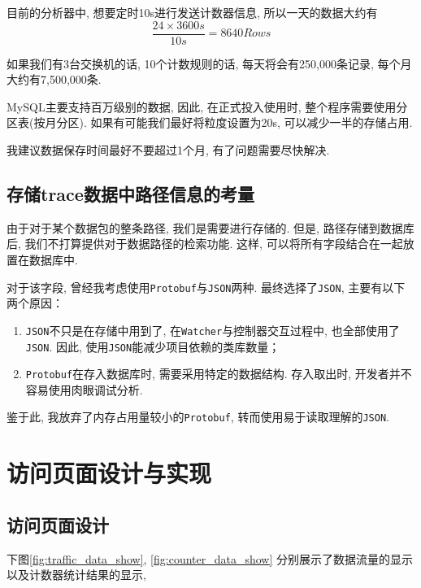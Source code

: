 目前的分析器中, 想要定时10s进行发送计数器信息, 所以一天的数据大约有
$$\frac{24 \times 3600 s}{10s} = 8640 Rows $$

如果我们有3台交换机的话, 10个计数规则的话, 每天将会有250,000条记录,
每个月大约有7,500,000条.

MySQL主要支持百万级别的数据, 因此, 在正式投入使用时,
整个程序需要使用分区表(按月分区).
如果有可能我们最好将粒度设置为20s, 可以减少一半的存储占用.

我建议数据保存时间最好不要超过1个月, 有了问题需要尽快解决.


\subsection{存储trace数据中路径信息的考量}

由于对于某个数据包的整条路径, 我们是需要进行存储的. 但是,
路径存储到数据库后, 我们不打算提供对于数据路径的检索功能. 这样,
可以将所有字段结合在一起放置在数据库中.

对于该字段, 曾经我考虑使用\texttt{Protobuf}与\texttt{JSON}两种.
最终选择了\texttt{JSON}, 主要有以下两个原因：

\begin{enumerate}
\def\labelenumi{\arabic{enumi}.}
\item
  \texttt{JSON}不只是在存储中用到了,
  在\texttt{Watcher}与控制器交互过程中, 也全部使用了\texttt{JSON}. 因此,
  使用\texttt{JSON}能减少项目依赖的类库数量；
\item
  \texttt{Protobuf}在存入数据库时, 需要采用特定的数据结构. 存入取出时,
  开发者并不容易使用肉眼调试分析.
\end{enumerate}

鉴于此, 我放弃了内存占用量较小的\texttt{Protobuf},
转而使用易于读取理解的\texttt{JSON}.


\section{访问页面设计与实现}

\subsection{访问页面设计}

下图\ref{fig:traffic_data_show}, \ref{fig:counter_data_show}
分别展示了数据流量的显示以及计数器统计结果的显示,

